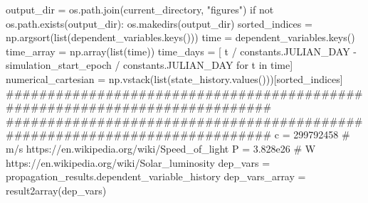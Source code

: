 {}
\markdownRendererSectionEnd \markdownRendererSectionBegin
{}\markdownRendererInterblockSeparator
{}output_dir = os.path.join(current_directory, "figures") if not os.path.exists(output_dir): os.makedirs(output_dir)\markdownRendererInterblockSeparator
{}
\markdownRendererSectionEnd \markdownRendererSectionBegin
{}\markdownRendererInterblockSeparator
{}
\markdownRendererSectionEnd \markdownRendererSectionBegin
{}\markdownRendererInterblockSeparator
{}sorted_indices = np.argsort(list(dependent_variables.keys()))\markdownRendererInterblockSeparator
{}
\markdownRendererSectionEnd \markdownRendererSectionBegin
{}\markdownRendererInterblockSeparator
{}
\markdownRendererSectionEnd \markdownRendererSectionBegin
{}\markdownRendererInterblockSeparator
{}time = dependent_variables.keys()\markdownRendererInterblockSeparator
{}
\markdownRendererSectionEnd \markdownRendererSectionBegin
{}\markdownRendererInterblockSeparator
{}time_array = np.array(list(time)) time_days = [ t / constants.JULIAN_DAY - simulation_start_epoch / constants.JULIAN_DAY for t in time]\markdownRendererInterblockSeparator
{}
\markdownRendererSectionEnd \markdownRendererSectionBegin
{}\markdownRendererInterblockSeparator
{}numerical_cartesian = np.vstack(list(state_history.values()))[sorted_indices]\markdownRendererInterblockSeparator
{}###########################################################################\markdownRendererInterblockSeparator
{}
\markdownRendererSectionEnd \markdownRendererSectionBegin
{}\markdownRendererInterblockSeparator
{}########################################################################### c = 299792458 # m/s https://en.wikipedia.org/wiki/Speed_of_light P = 3.828e26 # W https://en.wikipedia.org/wiki/Solar_luminosity\markdownRendererInterblockSeparator
{}
\markdownRendererSectionEnd \markdownRendererSectionBegin
{}\markdownRendererInterblockSeparator
{}dep_vars = propagation_results.dependent_variable_history dep_vars_array = result2array(dep_vars)\markdownRendererInterblockSeparator
